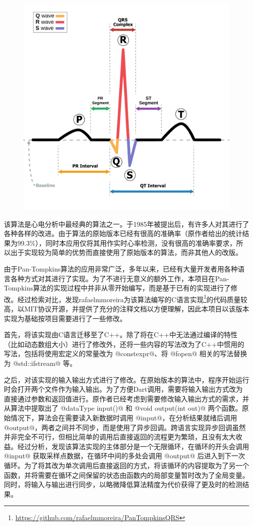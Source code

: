 \begin{figure}[!ht]
    \centering
    \includegraphics[width=.75\textwidth]{../assets/SinusRhythmLabels}
    \label{fig:sinus-rhythm}
\end{figure}

该算法是心电分析中最经典的算法之一。于1985年被提出后，有许多人对其进行了各种各样的改进。由于算法的原始版本已经有很高的准确率（原作者给出的统计结果为99.3\%），同时本应用仅将其用作实时心率检测，没有很高的准确率要求，所以出于实现较为简单的优势而直接使用了原始版本的算法，而非其他人的改版。

由于Pan-Tompkins算法的应用非常广泛，多年以来，已经有大量开发者用各种语言各种方式对其进行了实现。为了不进行无意义的额外工作，本项目在Pan-Tompkins算法的实现过程中并非从零开始编写，而是基于已有的实现进行了修改。经过检索对比，发现rafaelmmoreira为该算法编写的C语言实现\footnote{\url{https://github.com/rafaelmmoreira/PanTompkinsQRS}}的代码质量较高，以MIT协议开源，并提供了充分的注释文档以方便理解，因此本项目以该版本实现为基础按项目需要进行了一些修改。

首先，将该实现由C语言迁移至了C++。除了将在C++中无法通过编译的特性（比如动态数组大小）进行了修改外，还将一些内容的写法改为了C++中惯用的写法，包括将使用宏定义的常量改为 @constexpr@、将 @fopen@ 相关的写法替换为 @std::ifstream@ 等。

之后，对该实现的输入输出方式进行了修改。在原始版本的算法中，程序开始运行时会打开两个文件作为输入输出。为了方便Dart调用，需要将输入输出方式改为直接通过参数和返回值进行。原作者已经考虑到需要修改输入输出方式的需求，并从算法中提取出了 @dataType input()@ 和 @void output(int out)@ 两个函数。原始情况下，算法会在需要读入新数据时调用 @input@，在分析结果就绪后调用 @output@，两者之间并不同步，而是使用了异步回调。跨语言实现异步回调虽然并非完全不可行，但相比简单的调用后直接返回的流程更为繁琐，且没有太大收益。经过分析，发现该算法实现的主体部分是一个无限循环，在循环的开头会调用 @input@ 获取采样点数据，在循环中间的多处会调用 @output@ 后进入到下一次循环。为了将其改为单次调用后直接返回的方式，将该循环的内容提取为了另一个函数，并将需要在循环之间保留的状态由函数内的局部变量暂时改为了全局变量。同时，将输入与输出进行同步，以略微降低算法精度为代价获得了更及时的检测结果。

